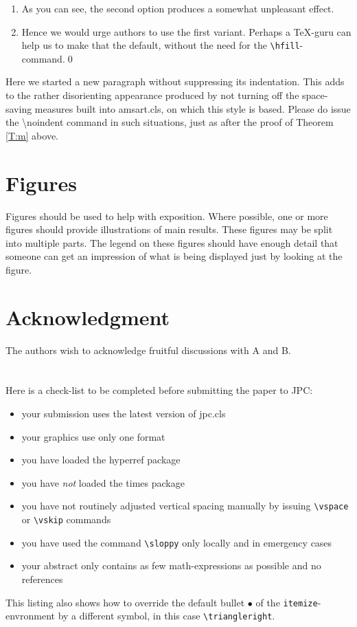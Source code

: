 \documentclass{jpc} %
\theoremstyle{plain}\newtheorem{satz}[thm]{Satz} %
\begin{document}
\proof %
\begin{enumerate}%
\item
  As you can see, the second option produces a somewhat unpleasant effect.
\item
  Hence we would urge authors to use the first variant.  Perhaps a
  \TeX-guru can help us to make that the default, without the need for
  the \texttt{\textbackslash hfill}-command.\qed
\end{enumerate}

  Here we started a new paragraph without suppressing its
  indentation.  This adds to the rather disorienting appearance
  produced by not turning off the space-saving measures built into
  amsart.cls, on which this style is based.  Please do issue the
  \hbox{\textbackslash noindent} command in such situations, just as
  after the proof of Theorem \ref{T:m} above.

\section{Figures}
Figures should be used to help with exposition. Where possible, one or more figures should provide illustrations of main results. These figures may be split into multiple parts. The legend on these figures should have enough detail that someone can get an impression of what is being displayed just by looking at the figure.

\section*{Acknowledgment}
  \noindent The authors wish to acknowledge fruitful discussions with
  A and B.





\appendix
\section{}
  Here is a check-list to be completed before submitting the paper to
  JPC:
\begin{itemize}[label=$\triangleright$]
\item your submission uses the latest version of jpc.cls
\item your graphics use only one format
\item you have loaded the hyperref package
\item you have \emph{not} loaded the times package
\item you have not routinely adjusted vertical spacing manually by issuing
  \texttt{\textbackslash vspace} or \texttt{\textbackslash vskip} commands
\item you have used the command \texttt{\textbackslash sloppy} only
  locally and in emergency cases
\item your abstract only contains as few math-expressions as possible and no
  references
\end{itemize}

  This listing also shows how to override the default bullet $\bullet$
  of the \texttt{itemize}-envronment by a different symbol, in this
  case \texttt{\textbackslash triangleright}.
\end{document}
